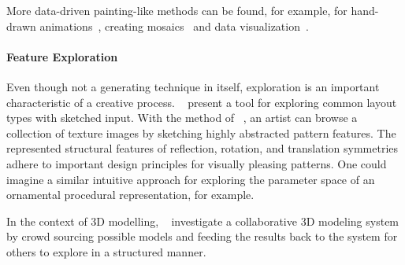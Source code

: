 
More data-driven painting-like methods can be found, for example, for hand-drawn animations~\cite{xing_2015_aha}, creating mosaics~\cite{igarashi_2010_dde,abdrashitov_2014_msi} and data visualization~\cite{xia_2018_ddc}.


\paragraph*{Feature Exploration}
\label{para:analysis_rulebased_exploration}

Even though not a generating technique in itself, exploration is an important characteristic of a creative process. \citeauthor*{todi_2016_sse}~\cite{todi_2016_sse} present a tool for exploring common layout types with sketched input. With the method of \citeauthor*{chen_2016_msi}~\cite{chen_2016_msi}, an artist can browse a collection of texture images by sketching highly abstracted pattern features. The represented structural features of reflection, rotation, and translation symmetries adhere to important design principles for visually pleasing patterns. One could imagine a similar intuitive approach for exploring the parameter space of an ornamental procedural representation, for example.

In the context of 3D modelling, \citeauthor*{talton_2009_emw}~\cite{talton_2009_emw} investigate a collaborative 3D modeling system by crowd sourcing possible models and feeding the results back to the system for others to explore in a structured manner. 

